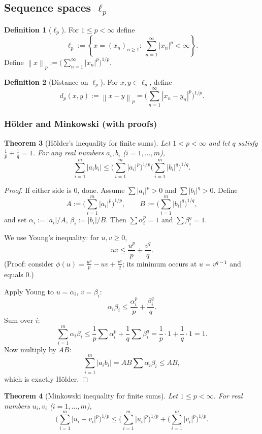 \documentclass[11pt]{article}
\newtheorem{theorem}{Theorem}[section]
\theoremstyle{definition}
\newtheorem{definition}[theorem]{Definition}
\newcommand{\norm}[1]{\left\lVert #1\right\rVert}
\newcommand{\set}[1]{\left\{#1\right\}}
\begin{document}
\subsection{Sequence spaces $\ell_p$}

\begin{definition}[$\ell_p$]
For $1\le p<\infty$ define
\[
\ell_p:=\set{x=(x_n)_{n\ge1}:\ \sum_{n=1}^\infty |x_n|^p<\infty}.
\]
Define $\norm{x}_p:=\big(\sum_{n=1}^\infty |x_n|^p\big)^{1/p}$.
\end{definition}

\begin{definition}[Distance on $\ell_p$]
For $x,y\in\ell_p$, define
\[
d_p(x,y):=\norm{x-y}_p=\Big(\sum_{n=1}^\infty |x_n-y_n|^p\Big)^{1/p}.
\]
\end{definition}

\subsubsection{H\"older and Minkowski (with proofs)}

\begin{theorem}[H\"older's inequality for finite sums]
Let $1<p<\infty$ and let $q$ satisfy $\frac1p+\frac1q=1$. For any real numbers $a_i,b_i$ ($i=1,\dots,m$),
\[
\sum_{i=1}^m |a_i b_i|\le \Big(\sum_{i=1}^m |a_i|^p\Big)^{1/p}\Big(\sum_{i=1}^m |b_i|^q\Big)^{1/q}.
\]
\end{theorem}

\begin{proof}
If either side is $0$, done. Assume $\sum |a_i|^p>0$ and $\sum |b_i|^q>0$. Define
\[
A:=\Big(\sum_{i=1}^m |a_i|^p\Big)^{1/p},\qquad B:=\Big(\sum_{i=1}^m |b_i|^q\Big)^{1/q},
\]
and set $\alpha_i:=|a_i|/A$, $\beta_i:=|b_i|/B$. Then $\sum \alpha_i^p=1$ and $\sum \beta_i^q=1$.

We use Young's inequality: for $u,v\ge0$,
\[
uv\le \frac{u^p}{p}+\frac{v^q}{q}.
\]
(Proof: consider $\phi(u)=\frac{u^p}{p}-u v+\frac{v^q}{q}$; its minimum occurs at $u=v^{q-1}$ and equals $0$.)

Apply Young to $u=\alpha_i$, $v=\beta_i$:
\[
\alpha_i\beta_i\le \frac{\alpha_i^p}{p}+\frac{\beta_i^q}{q}.
\]
Sum over $i$:
\[
\sum_{i=1}^m \alpha_i\beta_i\le \frac1p\sum \alpha_i^p+\frac1q\sum \beta_i^q=\frac1p\cdot 1+\frac1q\cdot 1=1.
\]
Now multiply by $AB$:
\[
\sum_{i=1}^m |a_i b_i|=AB\sum \alpha_i\beta_i\le AB,
\]
which is exactly H\"older.
\end{proof}

\begin{theorem}[Minkowski inequality for finite sums]
Let $1\le p<\infty$. For real numbers $u_i,v_i$ ($i=1,\dots,m$),
\[
\Big(\sum_{i=1}^m |u_i+v_i|^p\Big)^{1/p}\le
\Big(\sum_{i=1}^m |u_i|^p\Big)^{1/p}+
\Big(\sum_{i=1}^m |v_i|^p\Big)^{1/p}.
\]
\end{theorem}
\end{document}
